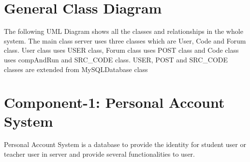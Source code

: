 \clearpage
\section{General Class Diagram}
The following UML Diagram shows all the classes and relationships in the whole system.\newline
The main class server uses three classes which are User, Code and Forum class. User class uses USER class, Forum class uses POST class and Code class uses compAndRun and SRC\_CODE class. USER, POST and SRC\_CODE classes are extended from MySQLDatabase class\newline
\begin{figure}[H]
 \label{1}
 \end{figure}
\clearpage

\section{Component-1: Personal Account System}
Personal Account System is a database to provide the identity for student user or teacher user in server and provide several functionalities to user.\newline

